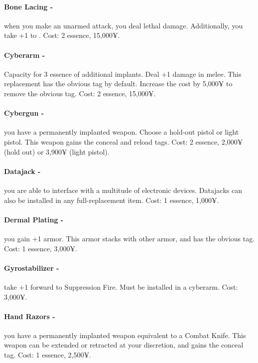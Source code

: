 \paragraph{Bone Lacing -} when you make an unarmed attack, you deal lethal damage. Additionally, you take +1 to . Cost: 2 essence, 15,000¥.

\paragraph{Cyberarm -} Capacity for 3 essence of additional implants. Deal +1 damage in melee. This replacement has the obvious tag by default. Increase the cost by 5,000¥ to remove the obvious tag. Cost: 2 essence, 15,000¥.

\paragraph{Cybergun -} you have a permanently implanted weapon. Choose a hold-out pistol or light pistol. This weapon gains the conceal and reload tags. Cost: 2 essence, 2,000¥ (hold out) or 3,900¥ (light pistol).

\paragraph{Datajack -} you are able to interface with a multitude of electronic devices. Datajacks can also be installed in any full-replacement item. Cost: 1 essence, 1,000¥.

\paragraph{Dermal Plating -} you gain +1 armor. This armor stacks with other armor, and has the obvious tag. Cost: 1 essence, 3,000¥.

\paragraph{Gyrostabilizer -} take +1 forward to Suppression Fire. Must be installed in a cyberarm. Cost: 3,000¥.

\paragraph{Hand Razors -} you have a permanently implanted weapon equivalent to a Combat Knife. This weapon can be extended or retracted at your discretion, and gains the conceal tag. Cost: 1 essence, 2,500¥.

